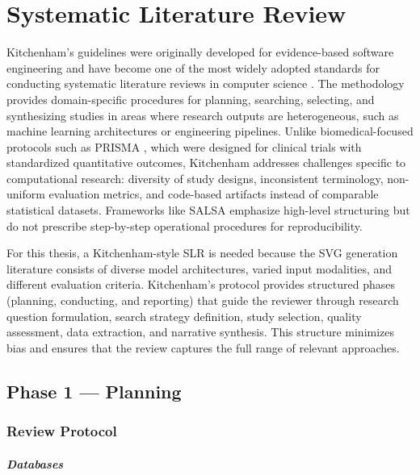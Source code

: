 \chapter{Systematic Literature Review}
\label{ch:slr}

Kitchenham's guidelines were originally developed for evidence-based
software engineering and have become one of the most widely adopted 
standards for conducting systematic literature reviews in computer 
science \cite{kitchenhamProceduresPerformingSystematic2004a}. The methodology provides 
domain-specific procedures for planning, searching, selecting, and 
synthesizing studies in areas where research outputs are heterogeneous, 
such as machine learning architectures or engineering pipelines. 
Unlike biomedical-focused protocols such as 
PRISMA \cite{moherPreferredReportingItems2009a}, which were designed for clinical 
trials with standardized quantitative outcomes, Kitchenham addresses 
challenges specific to computational research: diversity of study 
designs, inconsistent terminology, non-uniform evaluation metrics, 
and code-based artifacts instead of comparable statistical datasets. 
Frameworks like SALSA \cite{boothSystematicApproachesSuccessful2012} emphasize 
high-level structuring but do not prescribe step-by-step operational 
procedures for reproducibility.

For this thesis, a Kitchenham-style SLR is needed because the SVG 
generation literature consists of diverse model architectures, 
varied input modalities, and different evaluation criteria. 
Kitchenham's protocol provides structured phases 
(planning, conducting, and reporting) that guide the reviewer through 
research question formulation, search strategy definition, 
study selection, quality assessment, data extraction, and 
narrative synthesis. This structure minimizes bias and ensures that 
the review captures the full range of relevant approaches.

\section{Phase 1 --- Planning}

\subsection{Review Protocol}

\paragraph{Databases}

